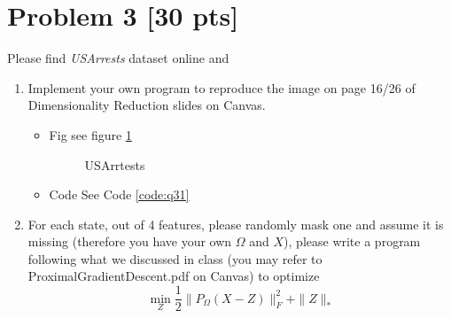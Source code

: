\documentclass[11pt]{article}
\newcommand{\mfile}[1]  {{\small }} %
\begin{document}
\section{Problem 3 [30 pts]}
Please find \textit{USArrests} dataset online and 
\begin{enumerate}
	\item Implement your own program to reproduce the image on page 16/26 of  Dimensionality Reduction slides on Canvas.
	\begin{itemize}
		\item Fig see figure \ref{fig:q31}
		\begin{figure}[h!]
			\centering
			\caption{USArrtests}
			\label{fig:q31}
		  \end{figure} 
		\item Code
		See Code \ref{code:q31}
	\end{itemize}
	
	\item For each state, out of 4 features, please randomly mask one and assume it is missing (therefore you have your own $\Omega$ and $X$), please write a program following what we discussed in class (you may refer to ProximalGradientDescent.pdf on Canvas) to optimize  
		\begin{equation}
		\min_{Z} \frac{1}{2}\|P_\Omega(X-Z)\|_F^2+\|Z\|_*
	\end{equation}
\end{enumerate}


\newpage
\end{document}
